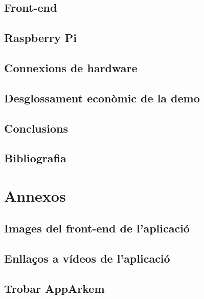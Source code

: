 \chapter{Front-end}


\chapter{Raspberry Pi}


\chapter{Connexions de hardware}


\chapter{Desglossament econòmic de la demo}


\chapter{Conclusions}


\chapter{Bibliografia}
\printbibliography[heading=none]

\part{Annexos}

\appendix

\chapter{Images del front-end de l'aplicació}


\chapter{Enllaços a vídeos de l'aplicació}


\chapter{Trobar AppArkem}

